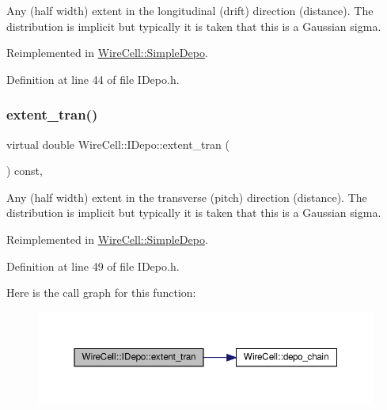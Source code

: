 Any (half width) extent in the longitudinal (drift) direction (distance). The distribution is implicit but typically it is taken that this is a Gaussian sigma. 

Reimplemented in \hyperlink{class_wire_cell_1_1_simple_depo_aebb13d9a9c5a5bc0f821d2e690c88c46}{Wire\+Cell\+::\+Simple\+Depo}.



Definition at line 44 of file I\+Depo.\+h.

\mbox{\label{class_wire_cell_1_1_i_depo_afbb1cebfd10723b572e3959afa665b5e}} 
\subsubsection{\texorpdfstring{extent\+\_\+tran()}{extent\_tran()}}
{\footnotesize\ttfamily virtual double Wire\+Cell\+::\+I\+Depo\+::extent\+\_\+tran (\begin{DoxyParamCaption}{ }\end{DoxyParamCaption}) const\hspace{0.3cm}{\ttfamily [inline]}, {\ttfamily [virtual]}}

Any (half width) extent in the transverse (pitch) direction (distance). The distribution is implicit but typically it is taken that this is a Gaussian sigma. 

Reimplemented in \hyperlink{class_wire_cell_1_1_simple_depo_ac03d9904acf5117c23c363c7168310cd}{Wire\+Cell\+::\+Simple\+Depo}.



Definition at line 49 of file I\+Depo.\+h.

Here is the call graph for this function\+:
\nopagebreak
\begin{figure}[H]
\begin{center}
\leavevmode
\includegraphics[width=350pt]{class_wire_cell_1_1_i_depo_afbb1cebfd10723b572e3959afa665b5e_cgraph}
\end{center}
\end{figure}
\mbox{\label{class_wire_cell_1_1_i_depo_ab32caab0a418f3fc0f185d8fc316537a}} 
